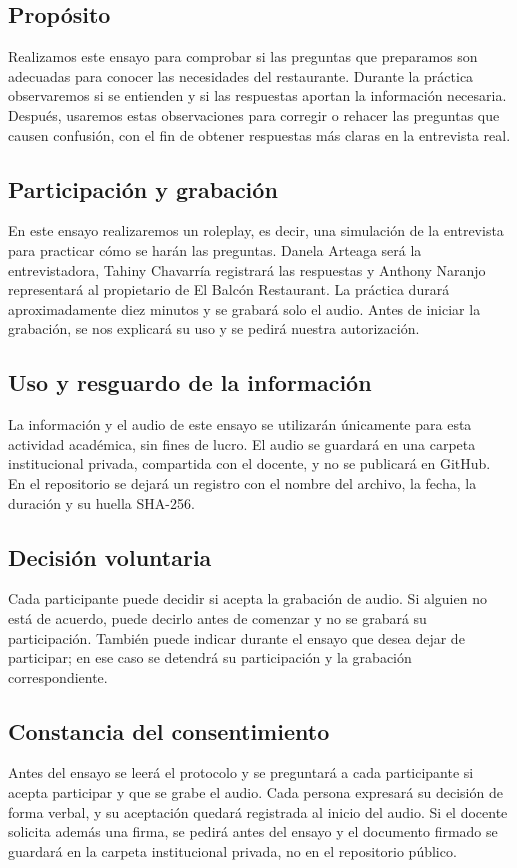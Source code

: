 
\subsection*{Propósito}
Realizamos este ensayo para comprobar si las preguntas que preparamos son adecuadas para conocer las necesidades del restaurante. Durante la práctica observaremos si se entienden y si las respuestas aportan la información necesaria. Después, usaremos estas observaciones para corregir o rehacer las preguntas que causen confusión, con el fin de obtener respuestas más claras en la entrevista real.

\subsection*{Participación y grabación}
En este ensayo realizaremos un roleplay, es decir, una simulación de la entrevista para practicar cómo se harán las preguntas. Danela Arteaga será la entrevistadora, Tahiny Chavarría registrará las respuestas y Anthony Naranjo representará al propietario de El Balcón Restaurant. La práctica durará aproximadamente diez minutos y se grabará solo el audio. Antes de iniciar la grabación, se nos explicará su uso y se pedirá nuestra autorización.

\subsection*{Uso y resguardo de la información}
La información y el audio de este ensayo se utilizarán únicamente para esta actividad académica, sin fines de lucro. El audio se guardará en una carpeta institucional privada, compartida con el docente, y no se publicará en GitHub. En el repositorio se dejará un registro con el nombre del archivo, la fecha, la duración y su huella SHA-256.

\subsection*{Decisión voluntaria}
Cada participante puede decidir si acepta la grabación de audio. Si alguien no está de acuerdo, puede decirlo antes de comenzar y no se grabará su participación. También puede indicar durante el ensayo que desea dejar de participar; en ese caso se detendrá su participación y la grabación correspondiente.

\subsection*{Constancia del consentimiento}
Antes del ensayo se leerá el protocolo y se preguntará a cada participante si acepta participar y que se grabe el audio. Cada persona expresará su decisión de forma verbal, y su aceptación quedará registrada al inicio del audio. Si el docente solicita además una firma, se pedirá antes del ensayo y el documento firmado se guardará en la carpeta institucional privada, no en el repositorio público.
